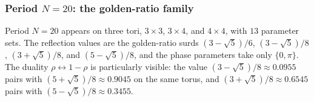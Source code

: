 \subsubsection{Period $N = 20$: the golden-ratio family}

Period $N = 20$ appears on three tori, $3 \times 3$, $3 \times 4$, and
$4 \times 4$, with $13$ parameter sets. The reflection values are the
golden-ratio surds $(3-\sqrt{5})/6$, $(3-\sqrt{5})/8$,
$(3+\sqrt{5})/8$, and $(5-\sqrt{5})/8$, and the phase parameters take
only $\{0, \pi\}$. The duality $\rho \leftrightarrow 1-\rho$ is
particularly visible: the value $(3-\sqrt{5})/8 \approx 0.0955$ pairs
with $(5+\sqrt{5})/8 \approx 0.9045$ on the same torus, and
$(3+\sqrt{5})/8 \approx 0.6545$ pairs with
$(5-\sqrt{5})/8 \approx 0.3455$.
